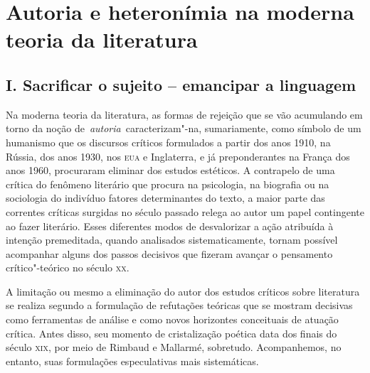 






\chapter*{Autoria e heteronímia na moderna teoria da literatura}

\section*{I. Sacrificar o sujeito -- emancipar a linguagem}


Na moderna teoria da literatura, as formas de rejeição que se vão
acumulando em torno da noção de~\emph{autoria}~caracterizam"-na,
sumariamente, como símbolo de um humanismo que os discursos críticos
formulados a partir dos anos 1910, na Rússia, dos anos 1930, nos
\textsc{eua} e Inglaterra, e já preponderantes na França dos anos 1960,
procuraram eliminar dos estudos estéticos. A contrapelo de uma crítica
do fenômeno literário que procura na psicologia, na biografia ou na
sociologia do indivíduo fatores determinantes do texto, a maior parte
das correntes críticas surgidas no século passado relega ao autor um
papel contingente ao fazer literário. Esses diferentes modos de
desvalorizar a ação atribuída à intenção premeditada, quando analisados
sistematicamente, tornam possível acompanhar alguns dos passos decisivos
que fizeram avançar o pensamento crítico"-teórico no século \textsc{xx}.

A limitação ou mesmo a eliminação do autor dos estudos críticos sobre
literatura se realiza segundo a formulação de refutações teóricas que se
mostram decisivas como ferramentas de análise e como novos horizontes
conceituais de atuação crítica. Antes disso, seu momento de
cristalização poética data dos finais do século \textsc{xix}, por meio
de Rimbaud e Mallarmé, sobretudo. Acompanhemos, no entanto, suas
formulações especulativas mais sistemáticas.

